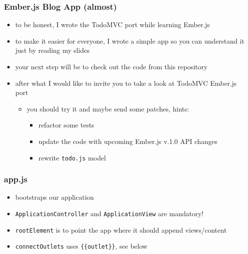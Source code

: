 \documentclass[compress]{beamer}
\begin{document}
\begin{frame}

\frametitle{Ember.js Blog App (almost)}

\begin{itemize}[<+->]
  \item to be honest, I wrote the TodoMVC port while learning Ember.js
  \item to make it easier for everyone, I wrote a simple app so you can understand it just by reading my slides
  \item your next step will be to check out the code from this repository
  \item after what I would like to invite you to take a look at TodoMVC Ember.js port
  \begin{itemize}[<+->]
    \item you should try it and maybe send some patches, hints:
    \begin{itemize}[<+->]
      \item refactor some tests
      \item update the code with upcoming Ember.js v.1.0 API changes
      \item rewrite \texttt{todo.js} model
    \end{itemize}
  \end{itemize}
\end{itemize}

\end{frame}

\begin{frame}

\frametitle{app.js}

\begin{itemize}[<+->]
  \item bootstraps our application
  \item \texttt{ApplicationController} and \texttt{ApplicationView} are mandatory!
  \item \texttt{rootElement} is to point the app where it should append views/content
  \item  \texttt{connectOutlets} uses \texttt{\{\{outlet\}\}}, see below
\end{itemize}

\inputminted[fontsize=\tiny,gobble=2,linenos=true,firstline=6,lastline=16]{javascript}{code/js/app.js}

\end{frame}
\end{document}
